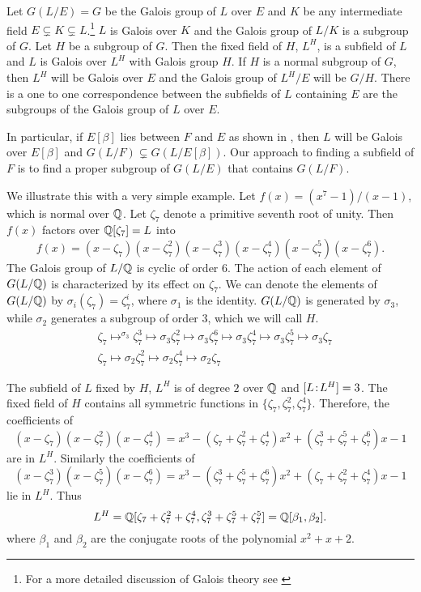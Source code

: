 Let $G(L/E) = G$ be the Galois group of $L$ over $E$ and $K$ be any
intermediate field $E \varsubsetneq K \varsubsetneq L$.\footnote{For a more
detailed discussion of Galois theory see \cite{Lang:Algebra}} $L$ is Galois
over $K$ and the Galois group of $L/K$ is a subgroup of $G$.  Let $H$ be a
subgroup of $G$.  Then the fixed field of $H$, $L^H$, is a subfield of $L$
and $L$ is Galois over $L^H$ with Galois group $H$.  If $H$ is a normal
subgroup of $G$, then $L^H$ will be Galois over $E$ and the Galois group of
$L^H/E$ will be $G/H$.  There is a one to one correspondence between the
subfields of $L$ containing $E$ are the subgroups of the Galois group of
$L$ over $E$.

In particular, if $E[\beta]$ lies between $F$ and $E$ as shown in
, then $L$ will be Galois over
$E[\beta]$ and $G(L/F) \varsubsetneq G(L/E[\beta])$.  Our approach to
finding a subfield of $F$ is to find a proper subgroup of $G(L/E)$ that
contains $G(L/F)$.

We illustrate this with a very simple example.  Let $f(x)= (x^7-1)/(x-1)$,
which is normal over $\mathbb{Q}$.  Let $\zeta_7$ denote a primitive seventh root
of unity.  Then $f(x)$ factors over $\mathbb{Q}[\zeta_7]=L$ into
\[
f(x) = (x - \zeta_7) (x - \zeta_7^2) (x - \zeta_7^3) (x - \zeta_7^4) (x -
\zeta_7^5) (x - \zeta_7^6).
\]
The Galois group of $L/\mathbb{Q}$ is cyclic of order $6$.  The action of each
element of $G(L/\mathbb{Q})$ is characterized by its effect on $\zeta_7$.  We can
denote the elements of $G(L/\mathbb{Q})$ by $\sigma_i(\zeta_7) = \zeta_7^i$, where
$\sigma_1$ is the identity.  $G(L/\mathbb{Q})$ is generated by $\sigma_3$, while
$\sigma_2$ generates a subgroup of order $3$, which we will call $H$.
\[
\begin{aligned}
& \zeta_7 \mapsto^{\sigma_3} \zeta_7^3 \mapsto{\sigma_3} \zeta_7^2
\mapsto{\sigma_3} \zeta_7^6 \mapsto{\sigma_3} \zeta_7^4
\mapsto{\sigma_3} \zeta_7^5 \mapsto{\sigma_3} \zeta_7 \\ & \zeta_7
\mapsto{\sigma_2} \zeta_7^2 \mapsto{\sigma_2} \zeta_7^4
\mapsto{\sigma_2} \zeta_7
\end{aligned}
\]

The subfield of $L$ fixed by $H$, $L^H$ is of degree $2$ over $\mathbb{Q}$ and
$[L\!:\!L^H]=3$.  The fixed field of $H$ contains all symmetric
functions in $\{ \zeta_7, \zeta_7^2, \zeta_7^4 \}$.  Therefore, the
coefficients of
\[
(x - \zeta_7)(x - \zeta_7^2)(x - \zeta_7^4) = x^3- (\zeta_7 + \zeta_7^2 +
\zeta_7^4)x^2 + (\zeta_7^3 + \zeta_7^5 + \zeta_7^6)x - 1
\]
are in $L^H$.  Similarly the coefficients of
\[
(x - \zeta_7^3)(x - \zeta_7^5)(x - \zeta_7^6) = x^3- (\zeta_7^3 + \zeta_7^5
+ \zeta_7^6)x^2 + (\zeta_7 + \zeta_7^2 + \zeta_7^4)x - 1
\]
lie in $L^H$.  Thus
\[
L^H = \mathbb{Q}[\zeta_7 + \zeta_7^2 + \zeta_7^4, \zeta_7^3+\zeta_7^5+\zeta_7^5] =
\mathbb{Q}[\beta_1, \beta_2].
\]
where $\beta_1$ and $\beta_2$ are the conjugate roots of the polynomial
$x^2+x+2$.

